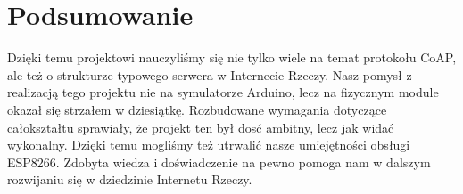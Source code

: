 \section{Podsumowanie}

Dzięki temu projektowi nauczyliśmy się nie tylko wiele na temat protokołu CoAP, ale też o strukturze typowego serwera w Internecie Rzeczy. Nasz pomysł z realizacją tego projektu nie na symulatorze Arduino, lecz na fizycznym module okazał się strzałem w dziesiątkę. Rozbudowane wymagania dotyczące całokształtu sprawiały, że projekt ten był dosć ambitny, lecz jak widać wykonalny. Dzięki temu mogliśmy też utrwalić nasze umiejętności obsługi ESP8266. Zdobyta wiedza i doświadczenie na pewno pomoga nam w dalszym rozwijaniu się w dziedzinie Internetu Rzeczy.